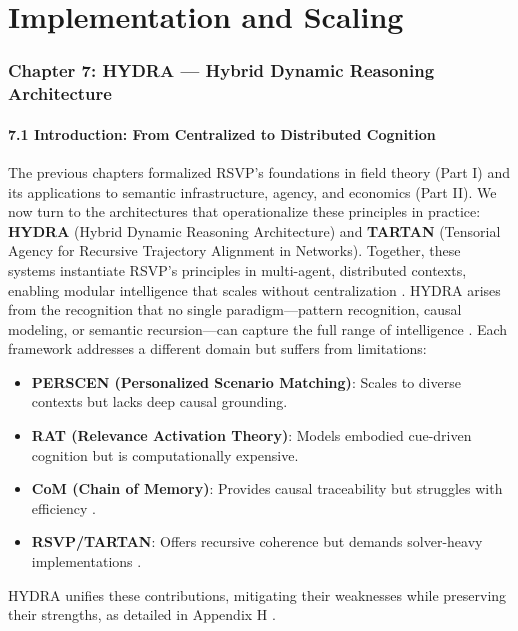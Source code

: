 \documentclass[12pt]{article}
\begin{document}
\part{Implementation and Scaling}
\section*{Chapter 7: HYDRA --- Hybrid Dynamic Reasoning Architecture}
\subsection*{7.1 Introduction: From Centralized to Distributed Cognition}
The previous chapters formalized RSVP's foundations in field theory (Part I) and its applications to semantic infrastructure, agency, and economics (Part II). We now turn to the architectures that operationalize these principles in practice: \textbf{HYDRA} (Hybrid Dynamic Reasoning Architecture) and \textbf{TARTAN} (Tensorial Agency for Recursive Trajectory Alignment in Networks). Together, these systems instantiate RSVP's principles in multi-agent, distributed contexts, enabling modular intelligence that scales without centralization \citep{bird1988, milewski2018}.
HYDRA arises from the recognition that no single paradigm---pattern recognition, causal modeling, or semantic recursion---can capture the full range of intelligence \citep{pearl2009}. Each framework addresses a different domain but suffers from limitations:
\begin{itemize}
    \item \textbf{PERSCEN (Personalized Scenario Matching)}: Scales to diverse contexts but lacks deep causal grounding.
    \item \textbf{RAT (Relevance Activation Theory)}: Models embodied cue-driven cognition but is computationally expensive.
    \item \textbf{CoM (Chain of Memory)}: Provides causal traceability but struggles with efficiency \citep{pearl2009}.
    \item \textbf{RSVP/TARTAN}: Offers recursive coherence but demands solver-heavy implementations \citep{milewski2018}.
\end{itemize}
HYDRA unifies these contributions, mitigating their weaknesses while preserving their strengths, as detailed in Appendix H \citep{friston2010, hohwy2013}.
\end{document}
